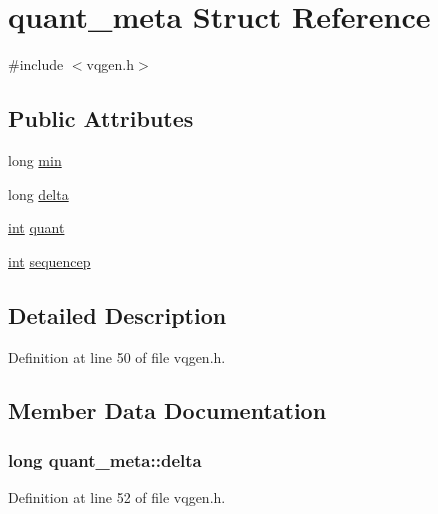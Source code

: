 \hypertarget{structquant__meta}{}\section{quant\+\_\+meta Struct Reference}
\label{structquant__meta}


{\ttfamily \#include $<$vqgen.\+h$>$}

\subsection*{Public Attributes}
\begin{DoxyCompactItemize}
\item 
long \hyperlink{structquant__meta_a5994b11f43c8e9582499578b39db0ff4}{min}
\item 
long \hyperlink{structquant__meta_adb028305209592c4135b07a1769ab8dc}{delta}
\item 
\hyperlink{xmltok_8h_a5a0d4a5641ce434f1d23533f2b2e6653}{int} \hyperlink{structquant__meta_ac6db75436255c267e1db09b1f24fc634}{quant}
\item 
\hyperlink{xmltok_8h_a5a0d4a5641ce434f1d23533f2b2e6653}{int} \hyperlink{structquant__meta_a6dc0b2157fe56a9436af5818ca221de9}{sequencep}
\end{DoxyCompactItemize}


\subsection{Detailed Description}


Definition at line 50 of file vqgen.\+h.



\subsection{Member Data Documentation}
\subsubsection[{\texorpdfstring{delta}{delta}}]{\setlength{\rightskip}{0pt plus 5cm}long quant\+\_\+meta\+::delta}\hypertarget{structquant__meta_adb028305209592c4135b07a1769ab8dc}{}\label{structquant__meta_adb028305209592c4135b07a1769ab8dc}


Definition at line 52 of file vqgen.\+h.

